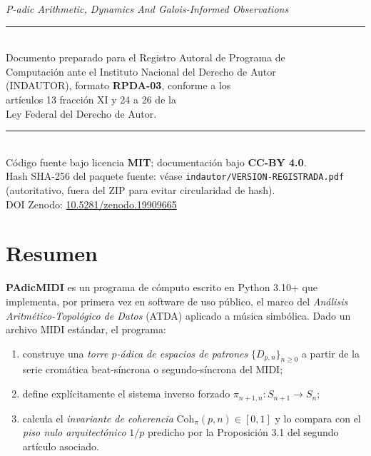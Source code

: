 \documentclass[11pt,a4paper,oneside]{article}
\theoremstyle{plain}
\theoremstyle{definition}
\theoremstyle{remark}
\newcommand{\Dn}{D_{p,n}}
\newcommand{\Cohpi}{\mathrm{Coh}_\pi}
\begin{document}
\begin{titlepage}
  {\small\itshape P-adic Arithmetic, Dynamics And Galois-Informed Observations}\\[1.5cm]

  \rule{0.6\linewidth}{0.4pt}\\[0.4cm]
  \small
  Documento preparado para el Registro Autoral de Programa de\\
  Computación ante el Instituto Nacional del Derecho de Autor\\
  (INDAUTOR), formato \textbf{RPDA-03}, conforme a los\\
  artículos 13 fracción XI y 24 a 26 de la\\
  Ley Federal del Derecho de Autor.\\[1cm]

  \rule{\linewidth}{0.4pt}\\[0.3cm]
  \footnotesize
  Código fuente bajo licencia \textbf{MIT};
  documentación bajo \textbf{CC-BY 4.0}.\\
  Hash SHA-256 del paquete fuente: véase
  \texttt{indautor/VERSION-REGISTRADA.pdf}\\
  (autoritativo, fuera del ZIP para evitar circularidad de hash).\\
  DOI Zenodo: \href{https://doi.org/10.5281/zenodo.19909665}{10.5281/zenodo.19909665}
  \vfill
\end{titlepage}

\thispagestyle{empty}
\section*{Resumen}

\textbf{PAdicMIDI} es un programa de cómputo escrito en Python 3.10+ que
implementa, por primera vez en software de uso público, el marco del
\emph{Análisis Aritmético-Topológico de Datos} (ATDA) aplicado a música
simbólica. Dado un archivo MIDI estándar, el programa:

\begin{enumerate}[noitemsep]
  \item construye una \emph{torre $p$-ádica de espacios de patrones}
        $\{\Dn\}_{n \geq 0}$ a partir de la serie cromática
        beat-síncrona o segundo-síncrona del MIDI;
  \item define explícitamente el sistema inverso forzado
        $\pi_{n+1,n}\colon S_{n+1} \to S_n$;
  \item calcula el \emph{invariante de coherencia}
        $\Cohpi(p,n) \in [0,1]$ y lo compara con el
        \emph{piso nulo arquitectónico} $1/p$ predicho por la Proposición
        3.1 del segundo artículo asociado.
\end{enumerate}
\end{document}
